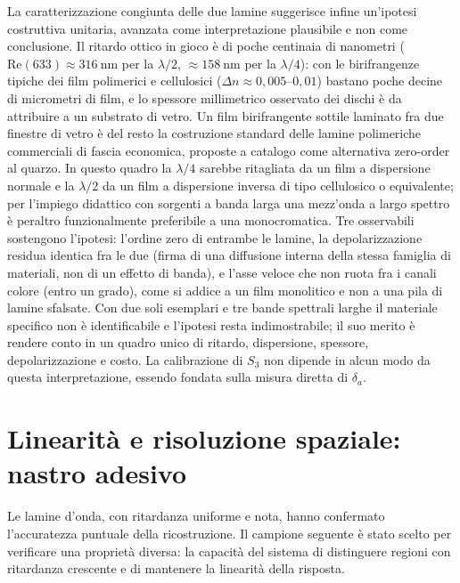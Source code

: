 La caratterizzazione congiunta delle due lamine suggerisce infine un'ipotesi costruttiva unitaria, avanzata come interpretazione plausibile e non come conclusione. Il ritardo ottico in gioco è di poche centinaia di nanometri ($\mathrm{Re}(633) \approx \SI{316}{\nano\meter}$ per la $\lambda/2$, $\approx \SI{158}{\nano\meter}$ per la $\lambda/4$): con le birifrangenze tipiche dei film polimerici e cellulosici ($\Delta n \approx 0{,}005$--$0{,}01$) bastano poche decine di micrometri di film, e lo spessore millimetrico osservato dei dischi è da attribuire a un substrato di vetro. Un film birifrangente sottile laminato fra due finestre di vetro è del resto la costruzione standard delle lamine polimeriche commerciali di fascia economica, proposte a catalogo come alternativa zero-order al quarzo. In questo quadro la $\lambda/4$ sarebbe ritagliata da un film a dispersione normale e la $\lambda/2$ da un film a dispersione inversa di tipo cellulosico o equivalente; per l'impiego didattico con sorgenti a banda larga una mezz'onda a largo spettro è peraltro funzionalmente preferibile a una monocromatica. Tre osservabili sostengono l'ipotesi: l'ordine zero di entrambe le lamine, la depolarizzazione residua identica fra le due (firma di una diffusione interna della stessa famiglia di materiali, non di un effetto di banda), e l'asse veloce che non ruota fra i canali colore (entro un grado), come si addice a un film monolitico e non a una pila di lamine sfalsate. Con due soli esemplari e tre bande spettrali larghe il materiale specifico non è identificabile e l'ipotesi resta indimostrabile; il suo merito è rendere conto in un quadro unico di ritardo, dispersione, spessore, depolarizzazione e costo. La calibrazione di $S_3$ non dipende in alcun modo da questa interpretazione, essendo fondata sulla misura diretta di $\delta_a$.

\section{Linearità e risoluzione spaziale: nastro adesivo}
\label{sec:risultati_nastro}

Le lamine d'onda, con ritardanza uniforme e nota, hanno confermato l'accuratezza puntuale della ricostruzione. Il campione seguente è stato scelto per verificare una proprietà diversa: la capacità del sistema di distinguere regioni con ritardanza crescente e di mantenere la linearità della risposta.


